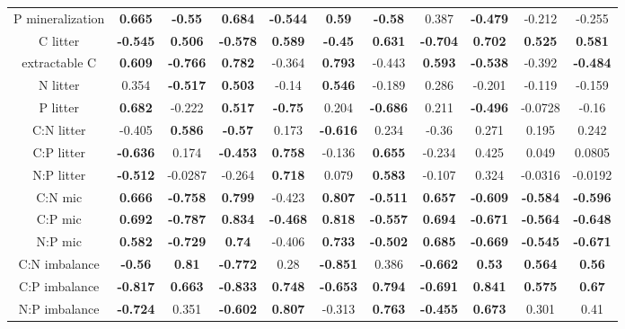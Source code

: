 \documentclass[authoryear,preprint,review,12pt]{elsarticle}
\begin{document}
\begin{table}[h!]
\begin{center}
{\begin{tabular}{ccccccccccc}
  P mineralization & \textbf{ 0.665 } & \textbf{ -0.55 } & \textbf{ 0.684 } & \textbf{ -0.544 } & \textbf{ 0.59 } & \textbf{ -0.58 } & 0.387 & \textbf{ -0.479 } & -0.212 & -0.255 \\ 
  C litter & \textbf{ -0.545 } & \textbf{ 0.506 } & \textbf{ -0.578 } & \textbf{ 0.589 } & \textbf{ -0.45 } & \textbf{ 0.631 } & \textbf{ -0.704 } & \textbf{ 0.702 } & \textbf{ 0.525 } & \textbf{ 0.581 } \\ 
  extractable C & \textbf{ 0.609 } & \textbf{ -0.766 } & \textbf{ 0.782 } & -0.364 & \textbf{ 0.793 } & -0.443 & \textbf{ 0.593 } & \textbf{ -0.538 } & -0.392 & \textbf{ -0.484 } \\ 
  N litter & 0.354 & \textbf{ -0.517 } & \textbf{ 0.503 } & -0.14 & \textbf{ 0.546 } & -0.189 & 0.286 & -0.201 & -0.119 & -0.159 \\ 
  P litter & \textbf{ 0.682 } & -0.222 & \textbf{ 0.517 } & \textbf{ -0.75 } & 0.204 & \textbf{ -0.686 } & 0.211 & \textbf{ -0.496 } & -0.0728 & -0.16 \\ 
  C:N litter & -0.405 & \textbf{ 0.586 } & \textbf{ -0.57 } & 0.173 & \textbf{ -0.616 } & 0.234 & -0.36 & 0.271 & 0.195 & 0.242 \\ 
  C:P litter & \textbf{ -0.636 } & 0.174 & \textbf{ -0.453 } & \textbf{ 0.758 } & -0.136 & \textbf{ 0.655 } & -0.234 & 0.425 & 0.049 & 0.0805 \\ 
  N:P litter & \textbf{ -0.512 } & -0.0287 & -0.264 & \textbf{ 0.718 } & 0.079 & \textbf{ 0.583 } & -0.107 & 0.324 & -0.0316 & -0.0192 \\ 
  C:N mic & \textbf{ 0.666 } & \textbf{ -0.758 } & \textbf{ 0.799 } & -0.423 & \textbf{ 0.807 } & \textbf{ -0.511 } & \textbf{ 0.657 } & \textbf{ -0.609 } & \textbf{ -0.584 } & \textbf{ -0.596 } \\ 
  C:P mic & \textbf{ 0.692 } & \textbf{ -0.787 } & \textbf{ 0.834 } & \textbf{ -0.468 } & \textbf{ 0.818 } & \textbf{ -0.557 } & \textbf{ 0.694 } & \textbf{ -0.671 } & \textbf{ -0.564 } & \textbf{ -0.648 } \\ 
  N:P mic & \textbf{ 0.582 } & \textbf{ -0.729 } & \textbf{ 0.74 } & -0.406 & \textbf{ 0.733 } & \textbf{ -0.502 } & \textbf{ 0.685 } & \textbf{ -0.669 } & \textbf{ -0.545 } & \textbf{ -0.671 } \\ 
  C:N imbalance & \textbf{ -0.56 } & \textbf{ 0.81 } & \textbf{ -0.772 } & 0.28 & \textbf{ -0.851 } & 0.386 & \textbf{ -0.662 } & \textbf{ 0.53 } & \textbf{ 0.564 } & \textbf{ 0.56 } \\ 
  C:P imbalance & \textbf{ -0.817 } & \textbf{ 0.663 } & \textbf{ -0.833 } & \textbf{ 0.748 } & \textbf{ -0.653 } & \textbf{ 0.794 } & \textbf{ -0.691 } & \textbf{ 0.841 } & \textbf{ 0.575 } & \textbf{ 0.67 } \\ 
  N:P imbalance & \textbf{ -0.724 } & 0.351 & \textbf{ -0.602 } & \textbf{ 0.807 } & -0.313 & \textbf{ 0.763 } & \textbf{ -0.455 } & \textbf{ 0.673 } & 0.301 & 0.41 \\ 
   \hline
\end{tabular}
}
\end{center}
\end{table}
\end{document}
